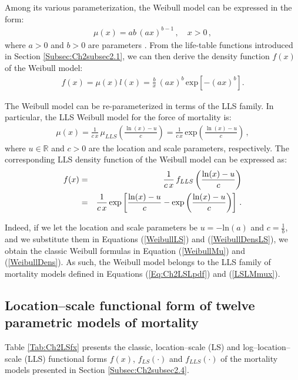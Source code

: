 \documentclass[Thesis]{subfiles}
\begin{document}
Among its various parameterization, the Weibull model can be expressed in the form:
\begin{eqnarray}\label{WeibullMu}
\mu (x)=ab \, (ax)^{b-1} \, , \quad x>0  \, ,
\end{eqnarray}
where $a>0$ and $b>0$ are parameters \citep{lawless2011statistical}. From the life-table functions introduced in Section \ref{Subsec:Ch2subsec2.1}, we can then derive the density function $f(x)$ of the Weibull model:
\begin{eqnarray} \label{WeibullDens}
f(x) = \mu (x)l(x)  = \frac{b}{x}  \, (ax)^{b}  \, \mathrm{exp} \left [ - (ax)^{b} \right ] .
\end{eqnarray}

The Weibull model can be re-parameterized in terms of the LLS family. In particular, the LLS Weibull model for the force of mortality is:
\begin{eqnarray}\label{WeibullLS}
\mu(x) = \frac{1}{c\,x} \, \mu_{LLS} \left(\frac{\ln(x)-u}{c} \right) = \frac{1}{c\,x} \, \mathrm{exp} \left (\frac{\ln(x)-u}{c} \right ) \, ,
\end{eqnarray}
where $u \in \mathbb{R}$ and $c > 0$ are the location and scale parameters, respectively. The corresponding LLS density function of the Weibull model can be expressed as:
\begin{eqnarray}\label{WeibullDensLS}
f(x) &=& \frac{1}{c\,x} \, f_{LLS} \left ( \frac{\ln(x)-u}{c} \right ) \notag \\ &=& \frac{1}{c\,x} \, \mathrm{exp} \left [ \frac{\ln(x)-u}{c} - \mathrm{exp} \left ( \frac{\ln(x)-u}{c} \right ) \right ] 
\, .
\end{eqnarray}

Indeed, if we let the location and scale parameters be $u =   - \mathrm{ln} (a)$ and $c=\frac{1}{b}$, and we substitute them in Equations (\ref{WeibullLS}) and (\ref{WeibullDensLS}), we obtain the classic Weibull formulas in Equation (\ref{WeibullMu}) and (\ref{WeibullDens}). As such, the Weibull model belongs to the LLS family of mortality models defined in Equations (\ref{Eq:Ch2LSLpdf}) and (\ref{LSLMmux}). 


\subsection{Location--scale functional form of twelve parametric models of mortality }\label{Subsec:Ch2appB}

Table \ref{Tab:Ch2LSfx} presents the classic, location--scale (LS) and log--location--scale (LLS) functional forms $f(x)$, $f_{LS}(\cdot)$ and $f_{LLS}(\cdot)$ of the mortality models presented in Section \ref{Subsec:Ch2subsec2.4}. 
\end{document}
